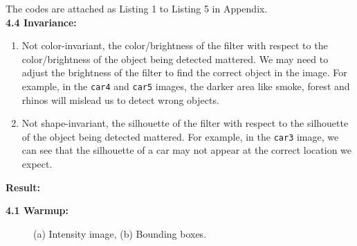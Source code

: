 \documentclass{assignment}
\begin{document}
\begin{problemlist}
The codes are attached as Listing 1 to Listing 5 in Appendix.\\

\textbf{4.4 Invariance:}
\begin{enumerate}[label={\alph*)}]
        \item Not color-invariant, the color/brightness of the filter with respect to the color/brightness of the object being detected mattered. We may need to adjust the brightness of the filter to find the correct object in the image. For example, in the \texttt{car4} and \texttt{car5} images, the darker area like smoke, forest and rhinos will mislead us to detect wrong objects.
        \item Not shape-invariant, the silhouette of the filter with respect to the silhouette of the object being detected mattered. For example, in the \texttt{car3} image, we can see that the silhouette of a car may not appear at the correct location we expect.
    \end{enumerate}

\textbf{Result:}

\textbf{4.1 Warmup:}
\begin{figure}[H]
    \begin{center}
        \hspace{0.5cm}
        \caption{(a) Intensity image, (b) Bounding boxes.}
        \label{fig:4_1images}
    \end{center}
\end{figure}


\end{problemlist}
\end{document}
